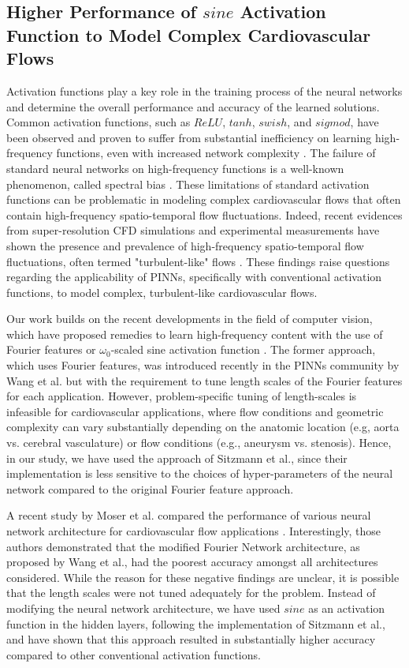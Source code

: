 \documentclass[times,twocolumn,final]{elsarticle}
\begin{document}
{\subsection {Higher Performance of $sine$ Activation Function to Model Complex Cardiovascular Flows}
Activation functions play a key role in the training process of the neural networks and determine the overall performance and accuracy of the learned solutions. Common activation functions, such as $ReLU$, $tanh$, $swish$, and $sigmod$, have been observed and proven to suffer from substantial inefficiency on learning high-frequency functions, even with increased network complexity \citep{Tancik2020_PINNs}. The failure of standard neural networks on high-frequency functions is a well-known phenomenon, called spectral bias \citep{Rahman2019_PINNs}. These limitations of standard activation functions can be problematic in modeling complex cardiovascular flows that often contain high-frequency spatio-temporal flow fluctuations. Indeed, recent evidences from super-resolution CFD simulations and experimental measurements have shown the presence and prevalence of high-frequency spatio-temporal flow fluctuations, often termed "turbulent-like" flows \citep{Khan2021_Aneurysms,Bruneau2023_Aneurysm} . These findings raise questions regarding the applicability of PINNs, specifically with conventional activation functions, to model complex, turbulent-like cardiovascular flows. 

Our work builds on the recent developments in the field of computer vision, which have proposed remedies to learn high-frequency content with the use of Fourier features \citep{Tancik2020_PINNs} or $\omega_{0}$-scaled sine activation function \citep{Sitzmann2020_PINNs}. The former approach, which uses Fourier features, was introduced recently in the PINNs community by Wang et al. \citep{Wang2020_PINNs} but with the requirement to tune length scales of the Fourier features for each application. However, problem-specific tuning of length-scales is infeasible for cardiovascular applications, where flow conditions and geometric complexity can vary substantially depending on the anatomic location (e.g, aorta vs. cerebral vasculature) or flow conditions (e.g., aneurysm vs. stenosis). Hence, in our study, we have used the approach of Sitzmann et al., since their implementation is less sensitive to the choices of hyper-parameters of the neural network compared to the original Fourier feature approach. 

A recent study by Moser et al. compared the performance of various neural network architecture for cardiovascular flow applications \citep{Moser2023_PINNs}. Interestingly, those authors demonstrated that the modified Fourier Network architecture, as proposed by Wang et al., had the poorest accuracy amongst all architectures considered. While the reason for these negative findings are unclear, it is possible that the length scales were not tuned adequately for the problem. Instead of modifying the neural network architecture, we have used $sine$ as an activation function in the hidden layers, following the implementation of Sitzmann et al.\citep{Sitzmann2020_PINNs}, and have shown that this approach resulted in substantially higher accuracy compared to other conventional activation functions.

}
\end{document}
